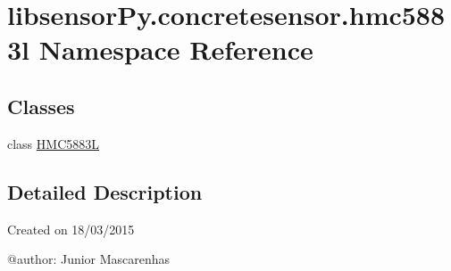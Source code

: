 \hypertarget{namespacelibsensorPy_1_1concretesensor_1_1hmc5883l}{}\section{libsensor\+Py.\+concretesensor.\+hmc5883l Namespace Reference}
\label{namespacelibsensorPy_1_1concretesensor_1_1hmc5883l}
\subsection*{Classes}
\begin{DoxyCompactItemize}
\item 
class \hyperlink{classlibsensorPy_1_1concretesensor_1_1hmc5883l_1_1HMC5883L}{H\+M\+C5883\+L}
\end{DoxyCompactItemize}


\subsection{Detailed Description}
\begin{DoxyVerb}Created on 18/03/2015

@author: Junior Mascarenhas
\end{DoxyVerb}
 